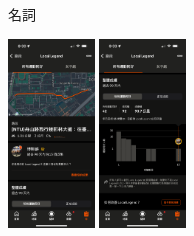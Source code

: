 \begin{frame}{名詞}
\begin{itemize}
\includegraphics[height=5cm]{localLegend.png}
\includegraphics[height=5cm]{localLegend2.png}
\end{itemize}
\end{frame}

